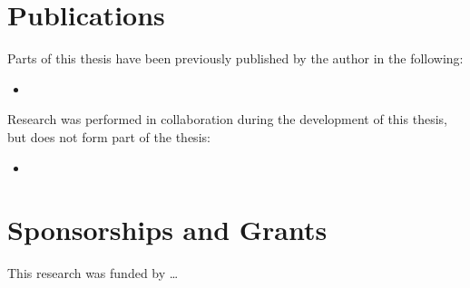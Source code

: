 
\begin{thesisdeclaration}

{\renewcommand*\thesection{\arabic{section}}\section{Publications}}

\noindent Parts of this thesis have been previously published by the author in the following:
\begin{itemize}
\item[\citep{ref}] 
\end{itemize}

\noindent Research was performed in collaboration during the development of this thesis, but does not form part of the thesis:
\begin{itemize}
\item[\citep{ref2}] 
\end{itemize}

{\renewcommand*\thesection{\arabic{section}}\section{Sponsorships and Grants}}

\noindent This research was funded by \ldots

\end{thesisdeclaration}
